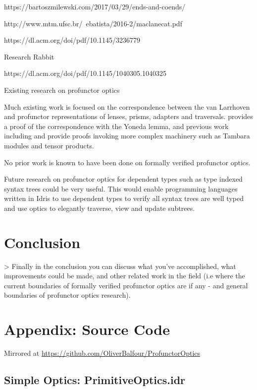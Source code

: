 \documentclass[]{report}
\begin{document}
https://bartoszmilewski.com/2017/03/29/ends-and-coends/

http://www.mtm.ufsc.br/~ebatista/2016-2/maclanecat.pdf

https://dl.acm.org/doi/pdf/10.1145/3236779

Research Rabbit

https://dl.acm.org/doi/pdf/10.1145/1040305.1040325

Existing research on profunctor optics

Much existing work is focused on the correspondence between the van Larrhoven and profunctor representations of lenses, prisms, adapters and traversals. \cite{boisseau2018yoneda} provides a proof of the correspondence with the Yoneda lemma, and previous work including \cite{pickering2017profunctor} and \cite{milewski2017profunctor} provide proofs invoking more complex machinery such as Tambara modules and tensor products.

No prior work is known to have been done on formally verified profunctor optics.

Future research on profunctor optics for dependent types such as type indexed syntax trees could be very useful. This would enable programming languages written in Idris to use dependent types to verify all syntax trees are well typed and use optics to elegantly traverse, view and update subtrees.

\section{Conclusion}

> Finally in the conclusion you can discuss what you've accomplished, what improvements could be made, and other related work in the field (i.e where the current boundaries of formally verified profunctor optics are if any - and general boundaries of profunctor optics research).


\printbibliography

\newpage
\section{Appendix: Source Code}

Mirrored at \href{https://github.com/OliverBalfour/ProfunctorOptics}{https://github.com/OliverBalfour/ProfunctorOptics}

\subsection{Simple Optics: PrimitiveOptics.idr}
\end{document}
